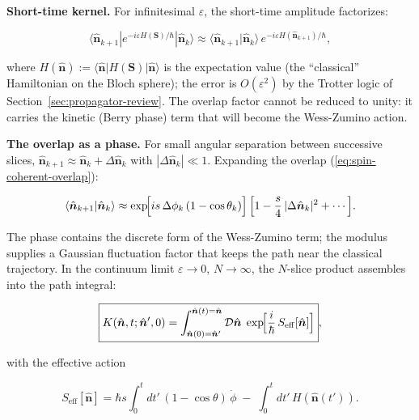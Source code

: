 \medskip\noindent\textbf{Short-time kernel.} For infinitesimal $\varepsilon$, the short-time amplitude factorizes:
\begin{linenomath}
\begin{equation}
\langle\hat{\bm n}_{k+1}|e^{-i\varepsilon H(\bm S)/\hbar}|\hat{\bm n}_{k}\rangle
\approx \langle\hat{\bm n}_{k+1}|\hat{\bm n}_{k}\rangle\,
e^{-i\varepsilon H(\hat{\bm n}_{k+1})/\hbar},
\label{eq:spin-short-time}
\end{equation}
\end{linenomath}
where $H(\hat{\bm n}) := \langle\hat{\bm n}|H(\bm S)|\hat{\bm n}\rangle$ is the expectation value (the ``classical'' Hamiltonian on the Bloch sphere); the error is $O(\varepsilon^{2})$ by the Trotter logic of Section~\ref{sec:propagator-review}. The overlap factor cannot be reduced to unity: it carries the kinetic (Berry phase) term that will become the Wess-Zumino action.

\medskip\noindent\textbf{The overlap as a phase.} For small angular separation between successive slices, $\hat{\bm n}_{k+1} \approx \hat{\bm n}_{k} + \Delta\hat{\bm n}_{k}$ with $|\Delta\hat{\bm n}_{k}| \ll 1$. Expanding the overlap (\eqref{eq:spin-coherent-overlap}):
\begin{linenomath}
\begin{equation}
\langle\hat{\bm n}_{k+1}|\hat{\bm n}_{k}\rangle
\approx \exp\!\Bigl[i s\,\Delta\phi_{k}\,(1 - \cos\theta_{k})\Bigr]\,
\Bigl[1 - \frac{s}{4}\,|\Delta\hat{\bm n}_{k}|^{2} + \cdots\Bigr] .
\label{eq:spin-overlap-expanded}
\end{equation}
\end{linenomath}
The phase contains the discrete form of the Wess-Zumino term; the modulus supplies a Gaussian fluctuation factor that keeps the path near the classical trajectory. In the continuum limit $\varepsilon \to 0$, $N \to \infty$, the $N$-slice product assembles into the path integral:
\begin{linenomath}
\begin{equation}
\boxed{K(\hat{\bm n},t;\hat{\bm n}',0) = \int_{\hat{\bm n}(0)=\hat{\bm n}'}^{\hat{\bm n}(t)=\hat{\bm n}} \mathcal{D}\hat{\bm n}\;
\exp\!\Bigl[\frac{i}{\hbar}\,S_{\mathrm{eff}}[\hat{\bm n}]\Bigr]} ,
\label{eq:spin-path-integral}
\end{equation}
\end{linenomath}
with the effective action
\begin{linenomath}
\begin{equation}
S_{\mathrm{eff}}[\hat{\bm n}] = \hbar s\int_{0}^{t} dt'\,(1 - \cos\theta)\,\dot{\phi}\;-\; \int_{0}^{t} dt'\,H(\hat{\bm n}(t')) .
\label{eq:spin-effective-action}
\end{equation}
\end{linenomath}

